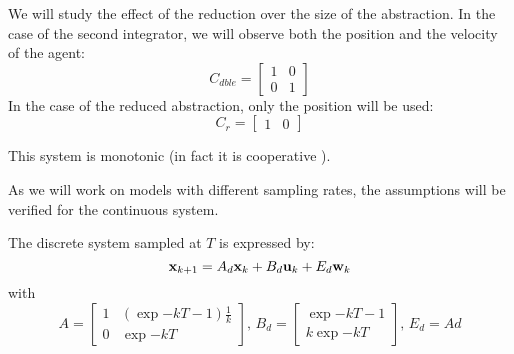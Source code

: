 We will study the effect of the reduction over the size of the abstraction. In the case of the second integrator, we will observe both the position and the velocity of the agent:
\begin{equation}
C_{dble} = \begin{bmatrix}
1 & 0\\
0 & 1
\end{bmatrix}
\end{equation}
In the case of the reduced abstraction, only the position will be used:
\begin{equation}
 C_r = \begin{bmatrix}
 1 & 0
 \end{bmatrix}
\end{equation}

This system is monotonic (in fact it is cooperative ).

As we will work on models with different sampling rates, the assumptions will be verified for the continuous system.

\newcommand{\dt}{T}
The discrete system sampled at $\dt$ is expressed by:
\begin{equation}
 \mathbf{x}_{k+1} = A_d  \mathbf{x}_k + B_d  \mathbf{u}_k + E_d  \mathbf{w}_k
\end{equation}
with
\begin{equation*} \label{eqn:sec_int_disc}
A = \begin{bmatrix}
1 & (\exp{-k \dt} - 1)\frac{1}{k}\\ 
0 & \exp{-k\dt}
\end{bmatrix}
\textrm{, }
B_d = \begin{bmatrix}
\exp{-k \dt} - 1 \\ 
k \exp{-k \dt}
\end{bmatrix}
\textrm{, }
E_d = Ad
\end{equation*}

